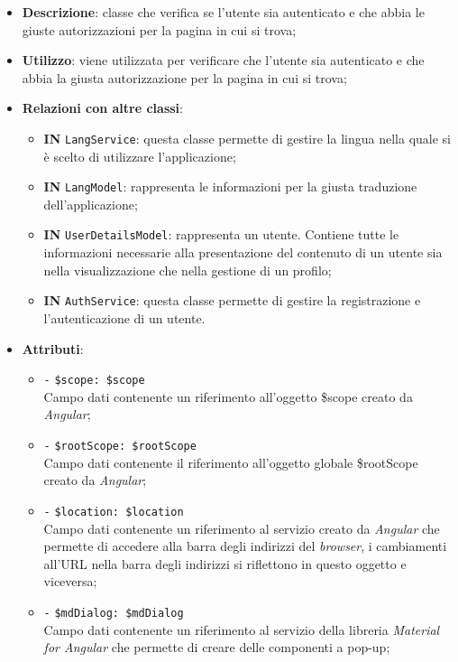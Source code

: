 		\begin{itemize}
			\item \textbf{Descrizione}: classe che verifica se l'utente sia autenticato e che abbia le giuste autorizzazioni per la pagina in cui si trova;
			\item \textbf{Utilizzo}: viene utilizzata per verificare che l’utente sia autenticato e che abbia la giusta autorizzazione per la pagina in cui si trova;
			\item \textbf{Relazioni con altre classi}: 
			\begin{itemize}
				\item \textbf{IN} \texttt{LangService}: questa classe permette di gestire la lingua nella quale si è scelto di utilizzare l'applicazione;
				\item \textbf{IN} \texttt{LangModel}: rappresenta le informazioni per la giusta traduzione dell'applicazione;
				\item \textbf{IN} \texttt{UserDetailsModel}: rappresenta un utente. Contiene tutte le informazioni necessarie alla presentazione del contenuto di un utente sia nella visualizzazione che nella gestione di un profilo;
				\item \textbf{IN} \texttt{AuthService}: questa classe permette di gestire la registrazione e l'autenticazione di un utente.
			\end{itemize}
			\item \textbf{Attributi}: 
			\begin{itemize}
				\item \texttt{-} \texttt{\$scope: \$scope} \\
				Campo dati contenente un riferimento all'oggetto \$scope creato da \textit{Angular};
				\item \texttt{-} \texttt{\$rootScope: \$rootScope} \\
				Campo dati contenente il riferimento all'oggetto globale \$rootScope creato da \textit{Angular};
				\item \texttt{-} \texttt{\$location: \$location} \\
				Campo dati contenente un riferimento al servizio creato da \textit{Angular} che permette di accedere alla barra degli indirizzi del \textit{browser}, i cambiamenti all'URL nella barra degli indirizzi si riflettono in questo oggetto e viceversa;
				\item \texttt{-} \texttt{\$mdDialog: \$mdDialog} \\
				Campo dati contenente un riferimento al servizio della libreria \textit{Material for Angular} che permette di creare delle componenti a pop-up;

\end{itemize}
\end{itemize}

